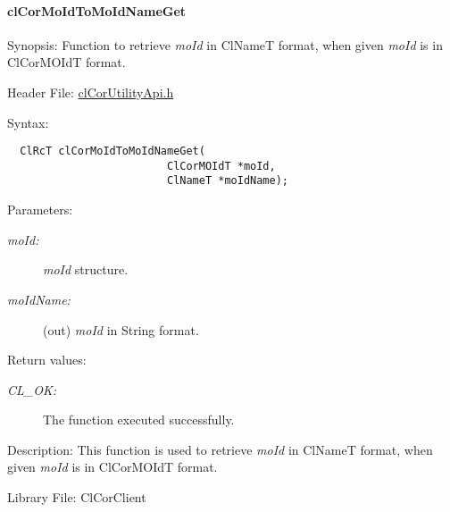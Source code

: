 \hypertarget{pagecor274}{}\paragraph{cl\-Cor\-Mo\-Id\-To\-Mo\-Id\-Name\-Get}\label{pagecor274}
\begin{Desc}
\item[Synopsis: ]Function to retrieve {\em mo\-Id\/} in Cl\-Name\-T format, when given {\em mo\-Id\/} is in Cl\-Cor\-MOId\-T format.\end{Desc}
\begin{Desc}
\item[Header File:]\hyperlink{cl_cor_utility_api_8h}{cl\-Cor\-Utility\-Api.h}\end{Desc}
\begin{Desc}
\item[Syntax:]

\footnotesize\begin{verbatim}  ClRcT clCorMoIdToMoIdNameGet(
                         ClCorMOIdT *moId, 
                         ClNameT *moIdName);
\end{verbatim}
\normalsize
\end{Desc}
\begin{Desc}
\item[Parameters:]
\begin{description}
\item[{\em mo\-Id:}]{\em mo\-Id\/} structure. \item[{\em mo\-Id\-Name:}](out) {\em mo\-Id\/} in String format.\end{description}
\end{Desc}
\begin{Desc}
\item[Return values:]
\begin{description}
\item[{\em CL\_\-OK:}]The function executed successfully.\end{description}
\end{Desc}
\begin{Desc}
\item[Description:]This function is used to retrieve {\em mo\-Id\/} in Cl\-Name\-T format, when given {\em mo\-Id\/} is in Cl\-Cor\-MOId\-T format.\end{Desc}
\begin{Desc}
\item[Library File:]Cl\-Cor\-Client\end{Desc}
